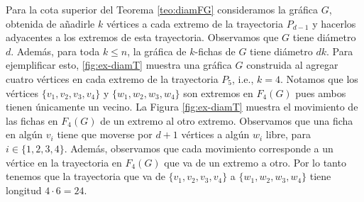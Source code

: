 Para la cota superior del Teorema \ref{teo:diamFG} consideramos la gr\'afica
$G$, obtenida de a\~{n}adirle $k$ v\'ertices a cada extremo de la trayectoria
$P_{d -1}$ y hacerlos adyacentes a los extremos de esta trayectoria. Observamos
que $G$ tiene di\'ametro $d$. Adem\'as, para toda $k \leq n$, la gr\'afica de
$k$-fichas de $G$ tiene di\'ametro $dk$. Para ejemplificar esto,
\cref{fig:ex-diamT} muestra una gr\'afica $G$ construida al agregar cuatro
v\'ertices en cada extremo de la trayectoria $P_5$, i.e., $k=4$. Notamos que los
v\'ertices $\{v_1,v_2,v_3,v_4\}$ y $\{w_1,w_2,w_3,w_4\}$ son extremos en
$F_4(G)$ pues ambos tienen \'unicamente un vecino. La Figura \ref{fig:ex-diamT}
muestra el movimiento de las fichas en $F_4(G)$ de un extremo al otro extremo.
Observamos que una ficha en alg\'un $v_i$ tiene que moverse por $d +1$
v\'ertices a alg\'un $w_i$ libre, para $i \in \{1,2,3,4\}$. Adem\'as, observamos
que cada movimiento corresponde a un v\'ertice en la trayectoria en $F_4(G)$ que
va de un extremo a otro. Por lo tanto tenemos que la trayectoria que va de
$\{v_1,v_2,v_3,v_4\}$ a $\{w_1,w_2,w_3,w_4\}$ tiene longitud $4 \cdot 6 = 24$.

\newpage

